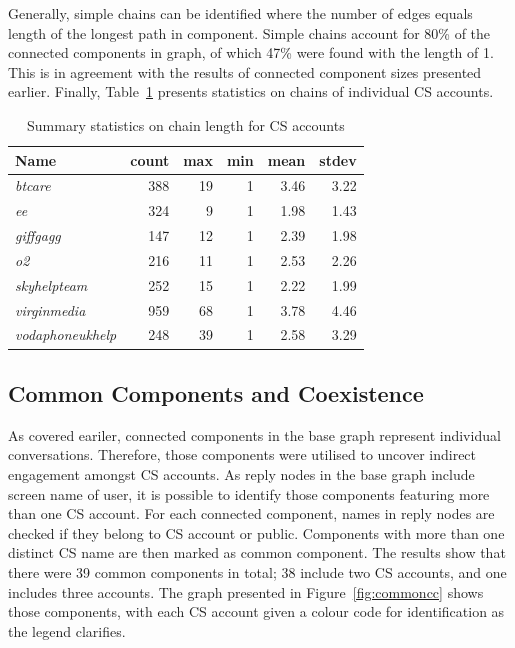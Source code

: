 \documentclass[sigconf]{acmart}
\begin{document}
{Generally, simple chains can be identified where the number of edges
equals length of the longest path in component. Simple chains account
for 80\% of the connected components in graph, of which 47\% were
found with the length of 1. This is in agreement with the results of
connected component sizes presented earlier. Finally,
Table~\ref{tbl:delaystatscl} presents statistics on chains of
individual CS accounts.


\begin{table}[!h]
\centering
\begin{tabularx}{\columnwidth}{lrrrrr}
\toprule
\textbf{Name} & \textbf{count} & \textbf{max} & \textbf{min} & \textbf{mean} & \textbf{stdev}\\ 
\midrule
{\emph{btcare}} & 388 & 19 & 1 & 3.46 & 3.22\\
{\emph{ee}} & 324 & 9 & 1 & 1.98 & 1.43\\
{\emph{giffgagg}} & 147 & 12 & 1 & 2.39 & 1.98\\ 
{\emph{o2}} & 216 & 11 & 1 & 2.53 & 2.26\\
{\emph{skyhelpteam}} & 252 & 15 & 1 & 2.22 & 1.99\\
{\emph{virginmedia}} & 959 & 68 & 1 & 3.78 & 4.46\\
{\emph{vodaphoneukhelp}} & 248 & 39 & 1 & 2.58 & 3.29\\
\bottomrule
\end{tabularx}
\caption{Summary statistics on chain length for CS accounts}
\label{tbl:delaystatscl}
\end{table}

\subsection{Common Components and Coexistence}

As covered eariler, connected components in the base graph represent 
individual conversations. Therefore, those components were utilised to uncover 
indirect engagement amongst CS accounts. As reply nodes in the base graph include 
screen name of user, it is possible to identify those components featuring 
more than one CS account. For each connected component, names in reply nodes
are checked if they belong to CS account or public. Components with more than
one distinct CS name are then marked as common component. The results show
that there were 39 common components in total; 38 include two CS accounts, and one
includes three accounts. The graph presented in
Figure~\ref{fig:commoncc} shows those components, with each CS account
given a colour code for identification as the legend clarifies.

}
\end{document}
